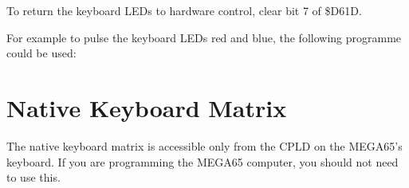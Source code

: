 To return the keyboard LEDs to hardware control, clear bit 7 of \$D61D.

For example to pulse the keyboard LEDs red and blue, the following programme
could be used:

\begin{tcolorbox}[colback=black,coltext=white]

\end{tcolorbox}

\section{Native Keyboard Matrix}

The native keyboard matrix is accessible only from the CPLD on the MEGA65's keyboard.
If you are programming the MEGA65 computer, you should not need to use this.

